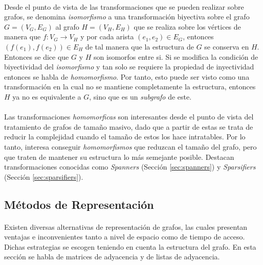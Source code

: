 \documentclass{subfiles}
\begin{document}
      \paragraph{}
      Desde el punto de vista de las transformaciones que se pueden realizar sobre grafos, se denomina \emph{isomorfismo} a una transformación biyectiva sobre el grafo $G =(V_G, E_G)$ al grafo $H = (V_H, E_H)$ que se realiza sobre los vértices de manera que $f: V_G \rightarrow V_H$ y por cada arista $(e_1, e_2) \in E_G$, entonces $(f(e_1), f(e_2)) \in E_H$ de tal manera que la estructura de $G$ se conserva en $H$. Entonces se dice que $G$ y $H$ son isomorfos entre si. Si se modifica la condición de biyectividad del \emph{isomorfismo} y tan solo se requiere la propiedad de inyectividad entonces se habla de \emph{homomorfismo}. Por tanto, esto puede ser visto como una transformación en la cual no se mantiene completamente la estructura, entonces $H$ ya no es equivalente a $G$, sino que es un \emph{subgrafo} de este.

      \paragraph{}
      Las transformaciones \emph{homomorficas} son interesantes desde el punto de vista del tratamiento de grafos de tamaño masivo, dado que a partir de estas se trata de reducir la complejidad cuando el tamaño de estos los hace intratables. Por lo tanto, interesa conseguir \emph{homomorfismos} que reduzcan el tamaño del grafo, pero que traten de mantener su estructura lo más semejante posible. Destacan transformaciones conocidas como \emph{Spanners} (Sección \ref{sec:spanners}) y \emph{Sparsifiers} (Sección \ref{sec:sparsifiers}).

      \subsection{Métodos de Representación}
      \label{sec:laplacian_matrix}

        \paragraph{}
        Existen diversas alternativas de representación de grafos, las cuales presentan ventajas e inconvenientes tanto a nivel de espacio como de tiempo de acceso. Dichas estrategias se escogen teniendo en cuenta la estructura del grafo. En esta sección se habla de matrices de adyacencia y de listas de adyacencia.
\end{document}
